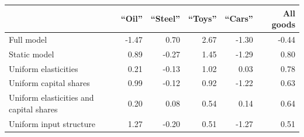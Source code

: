 \begin{tabular}{lrrrrr}
\toprule
 & ``Oil'' & ``Steel'' & ``Toys'' & ``Cars'' & All goods \\
\midrule
Full model & -1.47 & 0.70 & 2.67 & -1.30 & -0.44 \\
\midrule
Static model & 0.89 & -0.27 & 1.45 & -1.29 & 0.80 \\
Uniform elasticities & 0.21 & -0.13 & 1.02 & 0.03 & 0.78 \\
Uniform capital shares & 0.99 & -0.12 & 0.92 & -1.22 & 0.63 \\
Uniform elasticities and capital shares & 0.20 & 0.08 & 0.54 & 0.14 & 0.64 \\
Uniform input structure & 1.27 & -0.20 & 0.51 & -1.27 & 0.51 \\
\bottomrule
\end{tabular}
